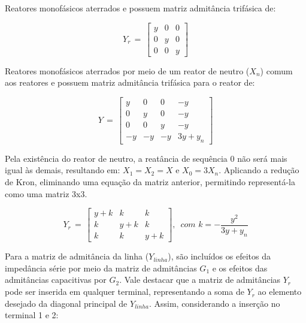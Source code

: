 \begin{subquestion}
    \item Reatores monofásicos aterrados e possuem matriz admitância trifásica de:
    
\begin{equation} \label{slide:1}
    Y_r \, = \,\begin{bmatrix} y & 0 & 0 \\ 0 & y & 0 \\ 0 & 0 & y  \end{bmatrix}
\end{equation}

    \item Reatores monofásicos aterrados por meio de um reator de neutro ($X_n$) comum aos reatores e possuem matriz admitância trifásica para o reator de:
    
\begin{equation} \label{slide:2}
    Y \, = \,\begin{bmatrix} y & 0 & 0 & -y \\ 0 & y & 0 & -y \\ 0 & 0 & y & -y \\ -y & -y & -y & 3y+y_n  \end{bmatrix}
\end{equation}

Pela existência do reator de neutro, a reatância de sequência 0 não será mais igual às demais, resultando em: $X_1 = X_2 = X$ e $X_0 = 3X_n$. Aplicando a redução de Kron, eliminando uma equação da matriz anterior, permitindo representá-la como uma matriz 3x3.

\begin{equation} \label{slide:3}
    Y_r \, = \,\begin{bmatrix} y+k & k & k \\ k & y+k & k \\ k & k & y+k  \end{bmatrix}, \, \, \, com \, \,  k=-\frac{y^2}{3y+y_n}
\end{equation}
\end{subquestion}

Para a matriz de admitância da linha ($Y_{linha}$), são incluídos os efeitos da impedância série por meio da matriz de admitâncias $G_1$ e os efeitos das admitâncias capacitivas por $G_2$. Vale destacar que a matriz de admitâncias $Y_r$ pode ser inserida em qualquer terminal, representando a soma de $Y_r$ ao elemento desejado da diagonal principal de $Y_{linha}$. Assim, considerando a inserção no terminal 1 e 2:

